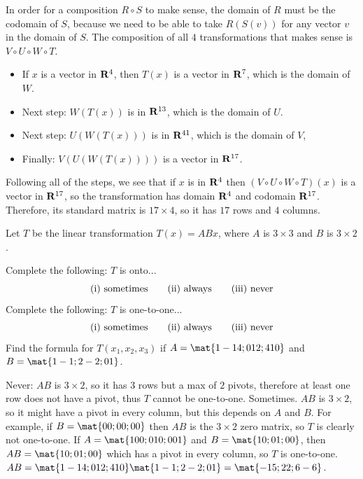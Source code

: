\begin{problems}
\begin{solution}
  In order for a composition $R \circ S$ to make sense, the domain of $R$ must
  be the codomain of $S$, because we need to be able to take $R(S(v))$ for any
  vector $v$ in the domain of $S$. \newline The composition of all $4$
  transformations that makes sense is $V \circ U \circ W \circ T$.
  \begin{itemize}
  \item If $x$ is a vector in ${\bf R}^{4}$, then $T(x)$ is a vector in
    ${\bf R}^{7}$, which is the domain of $W$. %
  \item Next step: $W(T(x))$ is in ${\bf R}^{13}$, which is the domain of $U$. %
  \item Next step: $U(W(T(x)))$ is in ${\bf R}^{41}$, which is the domain of $V$,
  \item Finally: $V(U(W(T(x))))$ is a vector in ${\bf R}^{17}$.
  \end{itemize}
  Following all of the steps, we see that if $x$ is in ${\bf R}^{4}$ then
  $(V \circ U \circ W \circ T)(x)$ is a vector in ${\bf R}^{17}$, so the
  transformation has domain ${\bf R}^{4}$ and codomain ${\bf R}^{17}$.
  Therefore, its standard matrix is $17 \times 4$, so it has $17$ rows and $4$
  columns.
\end{solution}

\problem %
Let $T$ be the linear transformation $T(x) = ABx$, where
$A$ is $3 \times 3$ and $B$ is $3 \times 2$.
\begin{subproblems}
\subproblem Complete the following: $T$ is onto...
\[\textup{(i) sometimes} \qquad \textup{(ii) always}
  \qquad \textup{(iii) never}\]
\subproblem Complete the following: $T$ is one-to-one...
\[\textup{(i) sometimes} \qquad \textup{(ii) always}
  \qquad \textup{(iii) never}\]
\subproblem Find the formula for $T(x_1, x_2, x_3)$ if
$A = \mat{1 -1 4; 0 1 2; 4 1 0}$ and $B = \mat{1 -1; 2 -2; 0 1}$.
\end{subproblems}

\begin{solution}
  \begin{subproblems}
    \subproblem Never: $AB$ is $3 \times 2$, so it has $3$ rows but a max of $2$
    pivots, therefore at least one row does not have a pivot, thus $T$ cannot be
    one-to-one. %
    \subproblem Sometimes.  $AB$ is $3 \times 2$, so it might have a pivot in
    every column, but this depends on $A$ and $B$.  For example, if
    $B = \mat{0 0; 0 0; 0 0}$ then $AB$ is the $3 \times 2$ zero matrix, so $T$
    is clearly not one-to-one.  \newline If $A = \mat{1 0 0; 0 1 0; 0 0 1}$ and
    $B = \mat{1 0; 0 1; 0 0}$, then $AB = \mat{1 0; 0 1; 0 0}$ which has a pivot
    in every column, so $T$ is one-to-one. %
    \subproblem
    $AB = \mat{1 -1 4; 0 1 2; 4 1 0} \mat{1 -1; 2 -2; 0 1} = %
    \mat{-1 5; 2 2; 6 -6}$.
  \end{subproblems}
\end{solution}



\end{problems}

